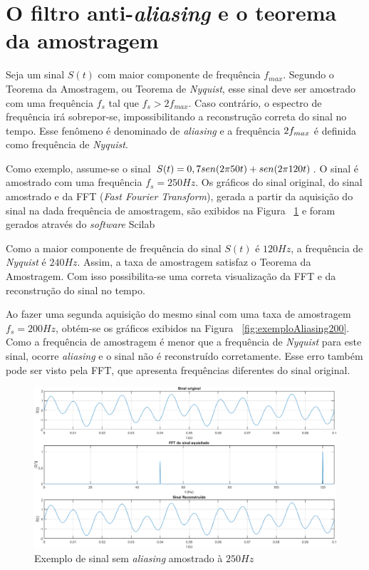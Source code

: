\documentclass[
	12pt,				%
	openright,			%
	twoside,			%
	a4paper,			%
	english,			%
	french,				%
	spanish,			%
	brazil,				%
	]{abntex2}
\begin{document}
	\section{O filtro anti-\textit{aliasing} e o teorema da amostragem}
		Seja um sinal $S(t)$ com maior componente de frequência
		$f_{max}$. Segundo o Teorema da Amostragem, ou Teorema de
		\textit{Nyquist}, esse sinal deve ser amostrado com uma
		frequência $f_s$ tal que $f_s>2f_{max}$. Caso contrário, o
		espectro de frequência irá sobrepor-se, impossibilitando a
		reconstrução correta do sinal no tempo. Esse fenômeno é denominado
		de \textit{aliasing} e a frequência $2\*f_{max}$ é definida como
		frequência de \textit{Nyquist}. \cite{nyquist}

		Como exemplo, assume-se o sinal $S(t) = 0,7\*sen(2\*\pi\*50\*t)
		+ sen(2\*\pi\*120\*t)$. O sinal é amostrado com uma frequência
		$f_s = 250Hz$. Os gráficos do sinal original, do sinal
		amostrado e da FFT (\textit{Fast Fourier Transform}), gerada a
		partir da aquisição do sinal na dada frequência de amostragem,
		são exibidos na Figura ~\ref{fig:exemploAliasing250} e foram gerados
		através do \textit{software} Scilab

		Como a maior componente de frequência do sinal $S(t)$ é $120Hz$,
		a frequência de \textit{Nyquist} é $240Hz$. Assim, a taxa de
		amostragem satisfaz o Teorema da Amostragem. Com isso possibilita-se
		uma correta visualização da FFT e da reconstrução do sinal no tempo.

		Ao fazer uma segunda aquisição do mesmo sinal com uma taxa de
		amostragem $f_s = 200Hz$, obtém-se os gráficos exibidos na
		Figura ~\ref{fig:exemploAliasing200}. Como a frequência de amostragem
		é menor que a frequência de \textit{Nyquist} para este sinal, ocorre
		\textit{aliasing} e o sinal não é reconstruído corretamente.
		Esse erro também pode ser visto pela FFT, que apresenta
		frequências diferentes do sinal original.

		\newpage

		\begin{figure}[!ht]
			\centering
			\includegraphics[width=\linewidth]{../Fotos/aliasingFs250.png}
			\caption{Exemplo de sinal sem \textit{aliasing} amostrado à $250Hz$}
			\label{fig:exemploAliasing250}
		\end{figure}
\end{document}
